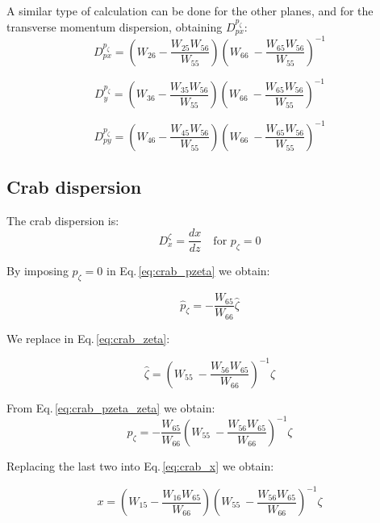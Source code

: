 A similar type of calculation can be done for the other planes, and for the transverse momentum dispersion, obtaining $D_{px}^{p_\zeta}$:
\begin{equation}
D_{px}^{p_\zeta} = \left(W_{26} -\frac{W_{25}W_{56}}{W_{55}}\right)\left( W_{66}\ -  \frac{W_{65}W_{56}}{W_{55}} \right)^{-1}
\end{equation}

\begin{equation}
D_{y}^{p_\zeta} = \left(W_{36} -\frac{W_{35}W_{56}}{W_{55}}\right)\left( W_{66}\ -  \frac{W_{65}W_{56}}{W_{55}} \right)^{-1}
\end{equation}

\begin{equation}
D_{py}^{p_\zeta} = \left(W_{46} -\frac{W_{45}W_{56}}{W_{55}}\right)\left( W_{66}\ -  \frac{W_{65}W_{56}}{W_{55}} \right)^{-1}
\end{equation}

\subsection{Crab dispersion}

The crab dispersion is:
\begin{equation}
D_x^\zeta = \frac{dx}{dz} \quad \text{for } p_\zeta=0
\end{equation}

By imposing $p_\zeta = 0$ in Eq.\,\ref{eq:crab_pzeta} we obtain:

\begin{equation}
\hat{p}_\zeta = - \frac{W_{65}}{W_{66}}\hat{\zeta}
\label{eq:crab_pzeta_zeta}
\end{equation}

We replace in Eq.\,\ref{eq:crab_zeta}:

\begin{equation}
\hat{\zeta} = \left( W_{55}\ -  \frac{W_{56}W_{65}}{W_{66}} \right)^{-1}\zeta
\end{equation}

From Eq.\,\ref{eq:crab_pzeta_zeta} we obtain:
\begin{equation}
\hat{p}_\zeta = - \frac{W_{65}}{W_{66}}\left( W_{55}\ -  \frac{W_{56}W_{65}}{W_{66}} \right)^{-1} \zeta
\end{equation}

Replacing the last two into Eq.\,\ref{eq:crab_x} we obtain:

\begin{equation}
x = \left(W_{15} -\frac{W_{16}W_{65}}{W_{66}}\right)\left( W_{55}\ -  \frac{W_{56}W_{65}}{W_{66}} \right)^{-1} \zeta
\end{equation}

